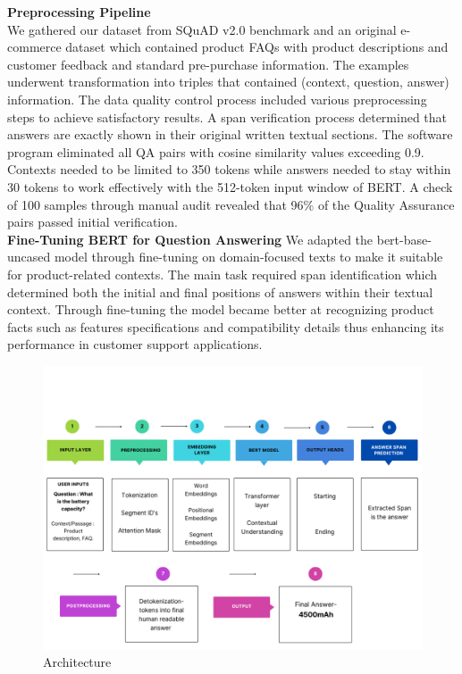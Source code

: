 \documentclass[10pt,conference]{IEEEtran}
\begin{document}
\textbf{Preprocessing Pipeline} \\ 
We gathered our dataset from SQuAD v2.0 benchmark and an original e-commerce dataset which contained product FAQs with product descriptions and customer feedback and standard pre-purchase information. The examples underwent transformation into triples that contained (context, question, answer) information. The data quality control process included various preprocessing steps to achieve satisfactory results. A span verification process determined that answers are exactly shown in their original written textual sections. The software program eliminated all QA pairs with cosine similarity values exceeding 0.9. Contexts needed to be limited to 350 tokens while answers needed to stay within 30 tokens to work effectively with the 512-token input window of BERT. A check of 100 samples through manual audit revealed that 96\% of the Quality Assurance pairs passed initial verification. \\

\textbf{Fine-Tuning BERT for Question Answering}
We adapted the bert-base-uncased model \cite{6} through fine-tuning on domain-focused texts to make it suitable for product-related contexts. The main task required span identification which determined both the initial and final positions of answers within their textual context. Through fine-tuning the model became better at recognizing product facts such as features specifications and compatibility details thus enhancing its performance in customer support applications.

\begin{figure}[!b]  %
\centering
\includegraphics[width=0.9\columnwidth]{fig2.png}  %
\caption{Architecture}
\label{fig: Architecture}
\end{figure}
\end{document}
